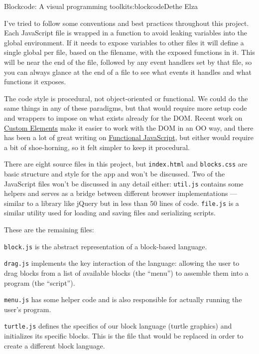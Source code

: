 \begin{aosachapter}{Blockcode: A visual programming toolkit}{s:blockcode}{Dethe Elza}
\label{stepping-through-the-code}

I've tried to follow some conventions and best practices throughout this
project. Each JavaScript file is wrapped in a function to avoid leaking
variables into the global environment. If it needs to expose variables
to other files it will define a single global per file, based on the
filename, with the exposed functions in it. This will be near the end of
the file, followed by any event handlers set by that file, so you can
always glance at the end of a file to see what events it handles and
what functions it exposes.

The code style is procedural, not object-oriented or functional. We
could do the same things in any of these paradigms, but that would
require more setup code and wrappers to impose on what exists already
for the DOM. Recent work on \href{http://webcomponents.org/}{Custom
Elements} make it easier to work with the DOM in an OO way, and there
has been a lot of great writing on
\href{https://leanpub.com/javascript-allonge/read}{Functional
JavaScript}, but either would require a bit of shoe-horning, so it felt
simpler to keep it procedural.

There are eight source files in this project, but \texttt{index.html}
and \texttt{blocks.css} are basic structure and style for the app and
won't be discussed. Two of the JavaScript files won't be discussed in
any detail either: \texttt{util.js} contains some helpers and serves as
a bridge between different browser implementations --- similar to a
library like jQuery but in less than 50 lines of code. \texttt{file.js}
is a similar utility used for loading and saving files and serializing
scripts.

These are the remaining files:

\begin{aosaitemize}

\item
  \texttt{block.js} is the abstract representation of a block-based
  language.
\item
  \texttt{drag.js} implements the key interaction of the language:
  allowing the user to drag blocks from a list of available blocks (the
  ``menu'') to assemble them into a program (the ``script'').
\item
  \texttt{menu.js} has some helper code and is also responsible for
  actually running the user's program.
\item
  \texttt{turtle.js} defines the specifics of our block language (turtle
  graphics) and initializes its specific blocks. This is the file that
  would be replaced in order to create a different block language.
\end{aosaitemize}


\end{aosachapter}
